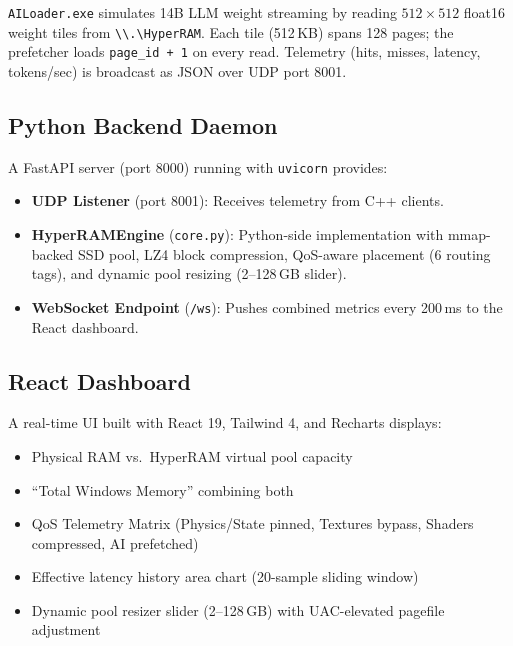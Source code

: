 \documentclass[11pt,a4paper]{article}
\newcommand{\code}[1]{\texttt{#1}}
\begin{document}
\code{AILoader.exe} simulates 14B LLM weight streaming by reading $512 \times 512$ float16 weight tiles from \code{\textbackslash\textbackslash .\textbackslash HyperRAM}. Each tile (512\,KB) spans 128 pages; the prefetcher loads \code{page\_id + 1} on every read. Telemetry (hits, misses, latency, tokens/sec) is broadcast as JSON over UDP port 8001.

\subsection{Python Backend Daemon}

A FastAPI server (port 8000) running with \code{uvicorn} provides:

\begin{itemize}
    \item \textbf{UDP Listener} (port 8001): Receives telemetry from C++ clients.
    \item \textbf{HyperRAMEngine} (\code{core.py}): Python-side implementation with mmap-backed SSD pool, LZ4 block compression, QoS-aware placement (6 routing tags), and dynamic pool resizing (2--128\,GB slider).
    \item \textbf{WebSocket Endpoint} (\code{/ws}): Pushes combined metrics every 200\,ms to the React dashboard.
\end{itemize}

\subsection{React Dashboard}

A real-time UI built with React 19, Tailwind 4, and Recharts displays:

\begin{itemize}
    \item Physical RAM vs.~HyperRAM virtual pool capacity
    \item ``Total Windows Memory'' combining both
    \item QoS Telemetry Matrix (Physics/State pinned, Textures bypass, Shaders compressed, AI prefetched)
    \item Effective latency history area chart (20-sample sliding window)
    \item Dynamic pool resizer slider (2--128\,GB) with UAC-elevated pagefile adjustment
\end{itemize}

\end{document}
